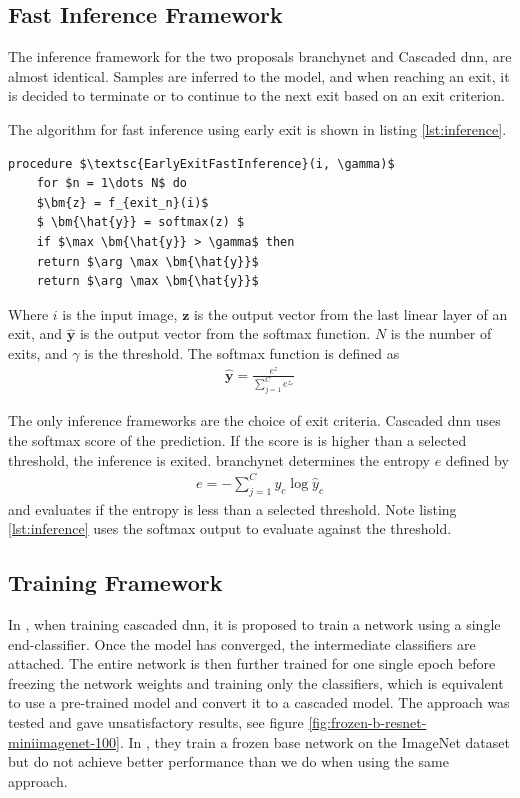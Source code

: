 \subsection{Fast Inference Framework} 

The inference framework for the two proposals \gls{branchynet} and Cascaded \gls{dnn}, are almost identical. Samples are inferred to the model, and when reaching an exit, it is decided to terminate or to continue to the next exit based on an exit criterion. 

The algorithm for fast inference using early exit is shown in listing \ref{lst:inference}. 

\begin{minipage}{\linewidth}
	\begin{lstlisting}[language = {}, mathescape=true, caption={Early Exit Fast Inference }, label={lst:inference}]
	procedure $\textsc{EarlyExitFastInference}(i, \gamma)$
	for $n = 1\dots N$ do
	$\bm{z} = f_{exit_n}(i)$
	$ \bm{\hat{y}} = softmax(z) $
	if $\max \bm{\hat{y}} > \gamma$ then
	return $\arg \max \bm{\hat{y}}$
	return $\arg \max \bm{\hat{y}}$ 
	\end{lstlisting}
\end{minipage}

Where $ i $ is the input image, $ \bm{z} $ is the output vector from the last linear layer of an exit, and $ \bm{\hat{y}} $ is the output vector from the softmax function. $ N $ is the number of exits, and $ \gamma $ is the threshold. The softmax function is defined as
\begin{align}
\bm{\hat{y}} = \frac{e^{z}}{\sum_{j=1}^{C}e^{z_c}}
\end{align}

The only inference frameworks are the choice of exit criteria. Cascaded \gls{dnn} uses the softmax score of the prediction. If the score is is higher than a selected threshold, the inference is exited. \gls{branchynet} determines the entropy $ e $ defined by
\begin{align}
e = -\sum_{j=1}^{C} y_c \log \hat{y}_c
\end{align}
and evaluates if the entropy is less than a selected threshold. Note listing \ref{lst:inference} uses the softmax output to evaluate against the threshold.

\subsection{Training Framework} 

In \cite{leroux_resource-constrained_2015}, when training cascaded \gls{dnn}, it is proposed to train a network using a single end-classifier. Once the model has converged, the intermediate classifiers are attached. The entire network is then further trained for one single epoch before freezing the network weights and training only the classifiers, which is equivalent to use a pre-trained model and convert it to a cascaded model. The approach was tested and gave unsatisfactory results, see figure \ref{fig:frozen-b-resnet-miniimagenet-100}. In \cite{leroux_cascading_2017}, they train a frozen base network on the ImageNet dataset but do not achieve better performance than we do when using the same approach.  

